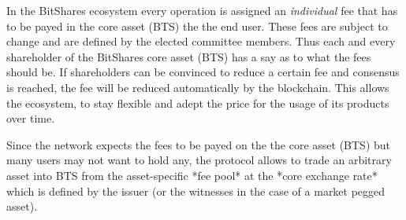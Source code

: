 In the BitShares ecosystem every operation is assigned an \emph{individual} fee
that has to be payed in the core asset (BTS) the the end user. These fees are
subject to change and are defined by the elected committee members. Thus each
and every shareholder of the BitShares core asset (BTS) has a say as to what
the fees should be. If shareholders can be convinced to reduce a certain fee
and consensus is reached, the fee will be reduced automatically by the
blockchain. This allows the ecosystem, to stay flexible and adept the price for
the usage of its products over time.

Since the network expects the fees to be payed on the the core asset (BTS) but
many users may not want to hold any, the protocol allows to trade an arbitrary
asset into BTS from the asset-specific *fee pool* at the *core exchange rate*
which is defined by the issuer (or the witnesses in the case of a market pegged
asset).
